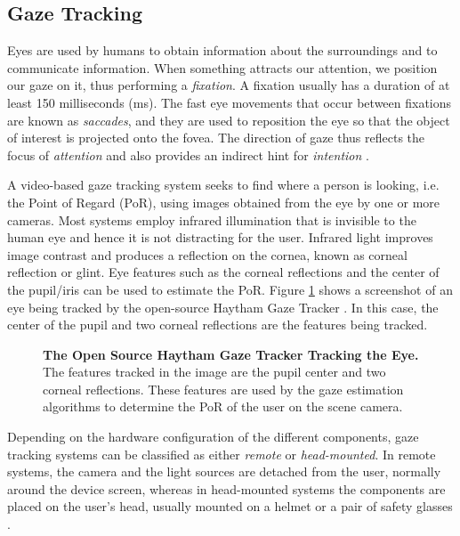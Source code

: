 \documentclass[jou,a4paper,notxfonts]{apa}
\begin{document}
\subsection{Gaze Tracking}
Eyes are used by humans to obtain information about the surroundings and to communicate information. When something
attracts our attention, we position our gaze on it, thus performing a \textit{fixation}. A fixation usually has a
duration of at least 150 milliseconds (ms). The fast eye movements that occur between fixations are known as
\textit{saccades}, and they are used to reposition the eye so that the object of interest is projected onto the fovea.
The direction of gaze thus reflects the focus of \textit{attention} and also provides an indirect hint for
\textit{intention} \cite{velichkovsky}.


A video-based gaze tracking system seeks to find where a person is looking, i.e. the Point of Regard (PoR), using images
obtained from the eye by one or more cameras. Most systems employ infrared illumination that is invisible to the human
eye and hence it is not distracting for the user. Infrared light improves image contrast and produces a reflection on
the cornea, known as corneal reflection or glint. Eye features such as the corneal reflections and the center of the
pupil/iris can be used to estimate the PoR. Figure \ref{screenGazeTracker} shows a screenshot of an eye being tracked by
the open-source Haytham Gaze Tracker \cite{mardanbegi2012eye}. In this case, the center of the pupil and two
corneal reflections are the features being tracked.

\begin{figure}[tp]
 \caption{\textbf{The Open Source Haytham Gaze Tracker Tracking the Eye.} The
features tracked in the image are the pupil center and two corneal reflections. These features are 
used by the gaze estimation algorithms to determine the PoR of the user on the scene camera.}
 \label{screenGazeTracker}
\end{figure}

Depending on the hardware configuration of the different components, gaze tracking systems can be classified as either
\textit{remote} or \textit{head-mounted}. In remote systems, the camera and the light sources are detached from the
user, normally around the device screen, whereas in head-mounted systems the components are placed on the user's head, usually
mounted on a helmet or a pair of safety glasses \cite{lowcostitugazetracker}.
\end{document}
